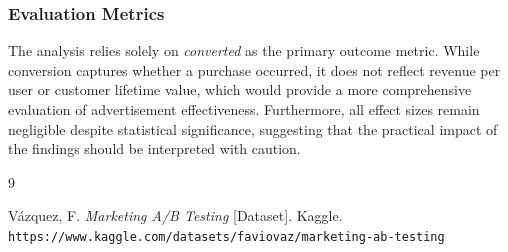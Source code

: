 \documentclass[12pt]{article}
\begin{document}
\subsubsection*{Evaluation Metrics}
The analysis relies solely on \textit{converted} as the primary outcome metric. 
While conversion captures whether a purchase occurred, it does not reflect 
revenue per user or customer lifetime value, which would provide a more 
comprehensive evaluation of advertisement effectiveness. Furthermore, all effect 
sizes remain negligible despite statistical significance, suggesting that the 
practical impact of the findings should be interpreted with caution.

\begin{thebibliography}{9}

Vázquez, F.
\textit{Marketing A/B Testing} [Dataset].
Kaggle.
\texttt{https://www.kaggle.com/datasets/faviovaz/marketing-ab-testing}

\end{thebibliography}
\end{document}
